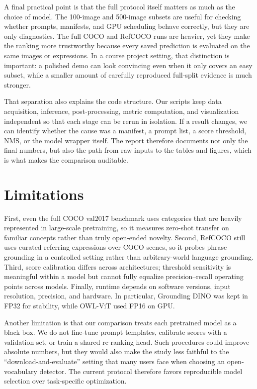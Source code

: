 \documentclass[conference]{IEEEtran}
\begin{document}
A final practical point is that the full protocol itself matters as much as the
choice of model. The 100-image and 500-image subsets are useful for checking
whether prompts, manifests, and GPU scheduling behave correctly, but they are
only diagnostics. The full COCO and RefCOCO runs are heavier, yet they make the
ranking more trustworthy because every saved prediction is evaluated on the
same images or expressions. In a course project setting, that distinction is
important: a polished demo can look convincing even when it only covers an
easy subset, while a smaller amount of carefully reproduced full-split
evidence is much stronger.

That separation also explains the code structure. Our scripts keep data
acquisition, inference, post-processing, metric computation, and visualization
independent so that each stage can be rerun in isolation. If a result changes,
we can identify whether the cause was a manifest, a prompt list, a score
threshold, NMS, or the model wrapper itself. The report therefore documents
not only the final numbers, but also the path from raw inputs to the tables and
figures, which is what makes the comparison auditable.

\section{Limitations}

First, even the full COCO val2017 benchmark uses categories that are heavily
represented in large-scale pretraining, so it measures zero-shot transfer on
familiar concepts rather than truly open-ended novelty. Second, RefCOCO still
uses curated referring expressions over COCO scenes, so it probes phrase
grounding in a controlled setting rather than arbitrary-world language
grounding. Third, score calibration differs across architectures; threshold
sensitivity is meaningful within a model but cannot fully equalize
precision--recall operating points across models. Finally, runtime depends on
software versions, input resolution, precision, and hardware. In particular,
Grounding DINO was kept in FP32 for stability, while OWL-ViT used FP16 on GPU.

Another limitation is that our comparison treats each pretrained model as a
black box. We do not fine-tune prompt templates, calibrate scores with a
validation set, or train a shared re-ranking head. Such procedures could improve
absolute numbers, but they would also make the study less faithful to the
``download-and-evaluate'' setting that many users face when choosing an
open-vocabulary detector. The current protocol therefore favors reproducible
model selection over task-specific optimization.
\end{document}
